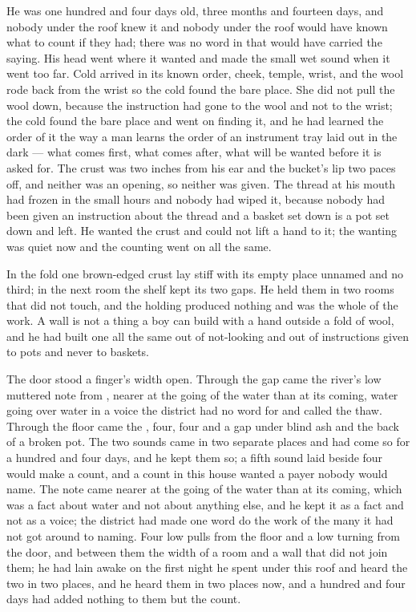 He was one hundred and four days old, three months and fourteen days, and nobody under the roof knew it and nobody under the roof would have known what to count if they had; there was no word in  that would have carried the saying. His head went where it wanted and made the small wet sound when it went too far. Cold arrived in its known order, cheek, temple, wrist, and the wool rode back from the wrist so the cold found the bare place. She did not pull the wool down, because the instruction had gone to the wool and not to the wrist; the cold found the bare place and went on finding it, and he had learned the order of it the way a man learns the order of an instrument tray laid out in the dark --- what comes first, what comes after, what will be wanted before it is asked for. The crust was two inches from his ear and the bucket's lip two paces off, and neither was an opening, so neither was given. The thread at his mouth had frozen in the small hours and nobody had wiped it, because nobody had been given an instruction about the thread and a basket set down is a pot set down and left. He wanted the crust and could not lift a hand to it; the wanting was quiet now and the counting went on all the same.

In the fold one brown-edged crust lay stiff with its empty place unnamed and no third; in the next room the shelf kept its two gaps. He held them in two rooms that did not touch, and the holding produced nothing and was the whole of the work. A wall is not a thing a boy can build with a hand outside a fold of wool, and he had built one all the same out of not-looking and out of instructions given to pots and never to baskets.

\scenebreak

The door stood a finger's width open. Through the gap came the river's low muttered note from , nearer at the going of the water than at its coming, water going over water in a voice the district had no word for and called the thaw. Through the floor came the , four, four and a gap under blind ash and the back of a broken pot. The two sounds came in two separate places and had come so for a hundred and four days, and he kept them so; a fifth sound laid beside four would make a count, and a count in this house wanted a payer nobody would name. The note came nearer at the going of the water than at its coming, which was a fact about water and not about anything else, and he kept it as a fact and not as a voice; the district had made one word do the work of the many it had not got around to naming. Four low pulls from the floor and a low turning from the door, and between them the width of a room and a wall that did not join them; he had lain awake on the first night he spent under this roof and heard the two in two places, and he heard them in two places now, and a hundred and four days had added nothing to them but the count.

